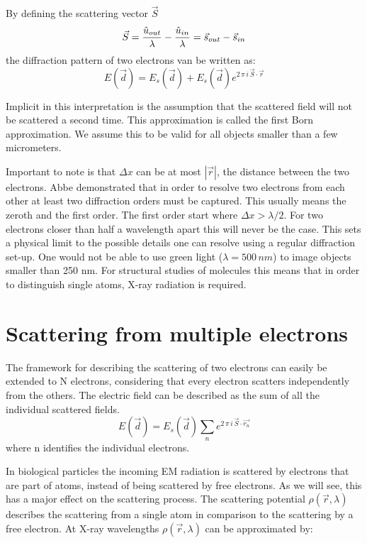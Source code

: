 By defining the scattering vector $\vec{S}$
\begin{equation}\label{eq:ScatteringVector}
\vec{S} = \frac{\hat{u}_{out}}{\lambda} - \frac{\hat{u}_{in}}{\lambda}\\ = \vec{s}_{out}-\vec{s}_{in}
\end{equation}
the diffraction pattern of two electrons van be written as:
\begin{equation}
E(\vec{d}) = E_s(\vec{d}) + E_s(\vec{d}) e^{2\,\pi\,  i\,\vec{S}\cdot\vec{r}}
\end{equation}

Implicit in this interpretation is the assumption that the scattered field will not be scattered a second time. This approximation is called the first Born approximation. We assume this to be valid for all objects smaller than a few micrometers.

Important to note is that $\Delta x $ can be at most $|\vec{r}|$, the distance between the two electrons. Abbe demonstrated that in order to resolve two electrons from each other at least two diffraction orders must be captured. This usually means the zeroth and the first order. The first order start where $\Delta x > \lambda/2$. For two electrons closer than half a wavelength apart this will never be the case. This sets a physical limit to the possible details one can resolve using a regular diffraction set-up. One would not be able to use green light ($\lambda = 500\,nm$) to image objects smaller than 250 nm. For structural studies of molecules this means that in order to distinguish single atoms, X-ray radiation is required.

\section{Scattering from multiple electrons}
The framework for describing the scattering of two electrons can easily be extended to N electrons, considering that every electron scatters independently from the others. The electric field can be described as the sum of all the individual scattered fields.
\begin{equation}\label{eq:boehoe}
E(\vec{d}) = E_s(\vec{d}) \sum_{n} e^{2\,\pi\,  i\,\vec{S}\cdot\vec{r_n}}
\end{equation}
where n identifies the individual electrons.

In biological particles the incoming EM radiation is scattered by electrons that are part of atoms, instead of being scattered by free electrons. As we will see, this has a major effect on the scattering process. The scattering potential $\rho(\vec{r},\lambda)$ describes the scattering from a single atom in comparison to the scattering by a free electron. At X-ray wavelengths $\rho(\vec{r},\lambda)$ can be approximated by:


